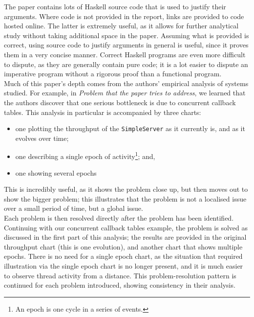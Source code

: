 \documentclass[9pt]{report}
\begin{document}
\noindent
The paper contains lots of Haskell source code that is used to justify their arguments.
Where code is not provided in the report, links are provided to code hosted online.
The latter is extremely useful, as it allows for further analytical study without taking additional space in the paper.
Assuming what is provided is correct, using source code to justify arguments in general is useful, since it proves them in a very concise manner.
Correct Haskell programs are even more difficult to dispute, as they are generally contain pure code; it is a lot easier to dispute an imperative program without a rigorous proof than a functional program.\\

\noindent
Much of this paper's depth comes from the authors' empirical analysis of systems studied.
For example, in {\it Problem that the paper tries to address}, we learned that the authors discover that one serious bottleneck is due to concurrent callback tables.
This analysis in particular is accompanied by three charts:
\begin{itemize}
\item one plotting the throughput of the \verb/SimpleServer/ as it currently is, and as it evolves over time;
\item one describing a single epoch of activity\footnote{An epoch is one cycle in a series of events.}; and,
\item one showing several epochs
\end{itemize}

This is incredibly useful, as it shows the problem close up, but then moves out to show the bigger problem; this illustrates that the problem is not a localised issue over a small period of time, but a global issue.\\

Each problem is then resolved directly after the problem has been identified.
Continuing with our concurrent callback tables example, the problem is solved as discussed in the first part of this analysis; the results are provided in the original throughput chart (this is one evolution), and another chart that shows multiple epochs.
There is no need for a single epoch chart, as the situation that required illustration via the single epoch chart is no longer present, and it is much easier to observe thread activity from a distance.
This problem-resolution pattern is continued for each problem introduced, showing consistency in their analysis.\\
\end{document}
